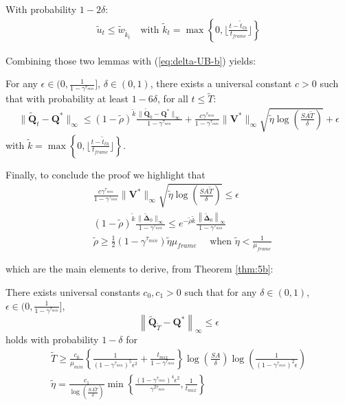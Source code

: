 \begin{lem}
  With probability $1-2\delta$:
  \begin{align}
    \tilde u_t \leq \tilde w_{\tilde k_t} \quad \text{with } \tilde k_t = \max \left\{ 0, \lfloor \frac{t - \tilde t_{th}}{t_{frame}} \rfloor \right\}
  \end{align}
\end{lem}

Combining those two lemmas with (\ref{eq:delta-UB-b}) yields:

\begin{thm}\label{thm:5b}
  For any $\epsilon \in (0, \frac{1}{1-\gamma^{\tau_{min}}}]$, $\delta \in (0, 1)$, there exists a universal constant $c > 0$ such that with probability at least $1 - 6\delta$, for all $t \leq \tilde T$:
    \begin{align}
      \|\tilde{\mathbf{Q}}_t - \mathbf{Q}^*\|_\infty \leq (1-\tilde\rho)^{\tilde k} \frac{\|\tilde{\mathbf{Q}}_0 - \mathbf{Q}^*\|_\infty}{1-\gamma^{\tau_{min}}} + \frac{c \gamma^{\tau_{min}}}{1-\gamma^{\tau_{min}}}\|\mathbf{V}^*\|_\infty \sqrt{\tilde\eta \log\left( \frac{SA\tilde T}{\delta} \right)} + \epsilon \label{eq:thm5-b}
    \end{align}
    with $\tilde k = \max \left\{ 0, \lfloor \frac{t - \tilde t_{th}}{t_{frame}} \rfloor \right\}$.
\end{thm}

Finally, to conclude the proof we highlight that
\begin{align}
  &\frac{c \gamma^{\tau_{min}}}{1-\gamma^{\tau_{min}}}\|\mathbf{V}^*\|_\infty \sqrt{\tilde\eta \log\left( \frac{SA\tilde T}{\delta} \right)} \leq \epsilon\\
  &(1-\tilde\rho)^{\tilde k} \frac{\|\tilde{\mathbf{\Delta}}_0\|_\infty }{1-\gamma^{\tau_{min}}} \leq e^{- \tilde\rho \tilde k}\frac{\left\| \tilde{\mathbf{\Delta}}_0 \right\|_\infty}{1-\gamma^{\tau_{min}}}\\
  &\tilde\rho \geq \frac{1}{2}(1-\gamma^{\tau_{min}})\tilde\eta\mu_{frame} \quad \text{ when } \tilde\eta < \frac{1}{\mu_{frame}}
\end{align}

which are the main elements to derive, from Theorem \ref{thm:5b}:

\begin{thm}\label{thm:1b}
  There exists universal constants $c_0, c_1 > 0$ such that for any $\delta \in (0,1)$, $\epsilon \in (0, \frac{1}{1 - \gamma^{\tau_{min}}}]$, $$\left\| \tilde{\mathbf{Q}}_{\tilde T} - \mathbf{Q}^* \right\|_\infty \leq \epsilon$$ holds with probability $1 - \delta$ for
    \begin{align}
      \tilde T \geq \frac{c_0}{\mu_{min}} \left\{ \frac{1}{(1 - \gamma^{\tau_{min}})^5\epsilon^2} + \frac{t_{mix}}{1 - \gamma^{\tau_{min}}} \right\}\log\left(\frac{SA}{\delta}\right)\log\left(\frac{1}{(1-\gamma^{\tau_{min}})^2 \epsilon}\right)\label{eq:T-b}\\
      \tilde\eta = \frac{c_1}{\log(\frac{SA\tilde T}{\delta})} \min \left\{ \frac{(1-\gamma^{\tau_{min}})^4 \epsilon^2}{\gamma^{2\tau_{min}}}, \frac{1}{t_{mix}} \right\}\label{eq:eta-b}
    \end{align}
\end{thm}

